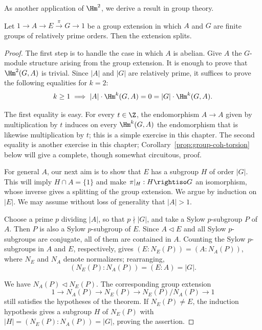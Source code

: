 As another application of $\Hm^2$, we derive a result in group theory.

\begin{theorem}\label{prop:Schur-Zassenhaus}
	Let $1\to A\to E\xrightarrow{\pi}G\to1$ be a group extension in which
	$A$ and $G$ are finite groups of relatively prime orders. Then the
	extension splits.
\end{theorem}
\begin{proof}
	The first step is to handle the case in which $A$ is abelian. Give $A$
	the $G$-module structure arising from the group extension. It is enough
	to prove that $\Hm^2(G,A)$ is trivial. Since $|A|$ and $|G|$ are
	relatively prime, it suffices to prove the following equalities for $k=2$:
	\[ k\geq1\implies |A|\cdot\Hm^k(G,A)=0
	=|G|\cdot\Hm^k(G,A). \]

	The first equality is easy. For every $t\in\Z$, the endomorphism
	$A\to A$ given by multiplication by $t$ induces on every $\Hm^k(G,A)$
	the endomorphism that is likewise multiplication by $t$; this is a
	simple exercise in this chapter. The second equality is another exercise
	in this chapter; Corollary~\ref{prop:group-coh-torsion} below will give a
	complete, though somewhat circuitous, proof.

	For general $A$, our next aim is to show that $E$ has a subgroup $H$ of
	order $|G|$. This will imply $H\cap A=\{1\}$ and make
	$\pi|_H:H\rightiso G$ an isomorphism, whose inverse gives a splitting of
	the group extension. We argue by induction on $|E|$. We may assume
	without loss of generality that $|A|>1$.

	Choose a prime $p$ dividing $|A|$, so that $p\nmid|G|$, and take a Sylow
	$p$-subgroup $P$ of $A$. Then $P$ is also a Sylow $p$-subgroup of $E$.
	Since $A\lhd E$ and all Sylow $p$-subgroups are conjugate, all of them
	are contained in $A$. Counting the Sylow $p$-subgroups in $A$ and $E$,
	respectively, gives $(E:N_E(P))=(A:N_A(P))$, where $N_E$ and $N_A$
	denote normalizers; rearranging,
	\[ (N_E(P):N_A(P))=(E:A)=|G|. \]

	We have $N_A(P)\lhd N_E(P)$. The corresponding group extension
	\[ 1\to N_A(P)\to N_E(P)\to N_E(P)/N_A(P)\to1 \]
	still satisfies the hypotheses of the theorem. If $N_E(P)\neq E$, the
	induction hypothesis gives a subgroup $H$ of $N_E(P)$ with
	$|H|=(N_E(P):N_A(P))=|G|$, proving the assertion.


\end{proof}
